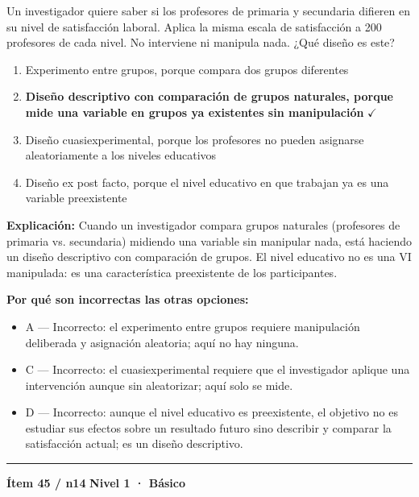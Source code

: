 \documentclass[12pt,a4paper]{article}
\begin{document}
Un investigador quiere saber si los profesores de primaria y secundaria difieren en su nivel de satisfacción laboral. Aplica la misma escala de satisfacción a 200 profesores de cada nivel. No interviene ni manipula nada. ¿Qué diseño es este?

\begin{enumerate}
  \item[A.] Experimento entre grupos, porque compara dos grupos diferentes
  \item[\textbf{\color{verde}B.}] \textbf{\color{verde} Diseño descriptivo con comparación de grupos naturales, porque mide una variable en grupos ya existentes sin manipulación} \hfill $\checkmark$
  \item[C.] Diseño cuasiexperimental, porque los profesores no pueden asignarse aleatoriamente a los niveles educativos
  \item[D.] Diseño ex post facto, porque el nivel educativo en que trabajan ya es una variable preexistente
\end{enumerate}

\noindent\textbf{\color{azul}Explicación:} Cuando un investigador compara grupos naturales (profesores de primaria vs. secundaria) midiendo una variable sin manipular nada, está haciendo un diseño descriptivo con comparación de grupos. El nivel educativo no es una VI manipulada: es una característica preexistente de los participantes.

\noindent\textbf{\color{gris}Por qué son incorrectas las otras opciones:}
\begin{itemize}
  \item {\small A — Incorrecto: el experimento entre grupos requiere manipulación deliberada y asignación aleatoria; aquí no hay ninguna.}
  \item {\small C — Incorrecto: el cuasiexperimental requiere que el investigador aplique una intervención aunque sin aleatorizar; aquí solo se mide.}
  \item {\small D — Incorrecto: aunque el nivel educativo es preexistente, el objetivo no es estudiar sus efectos sobre un resultado futuro sino describir y comparar la satisfacción actual; es un diseño descriptivo.}
\end{itemize}
\vspace{8pt}\hrule\vspace{10pt}

\begin{mdframed}[backgroundcolor=fondogris,linecolor=azul,linewidth=1pt,innerleftmargin=10pt,innerrightmargin=10pt,innertopmargin=7pt,innerbottommargin=7pt]
\textbf{Ítem 45 / n14} \hfill {\small\bfseries\color{azul} Nivel 1 · Básico}
\end{mdframed}
\end{document}
